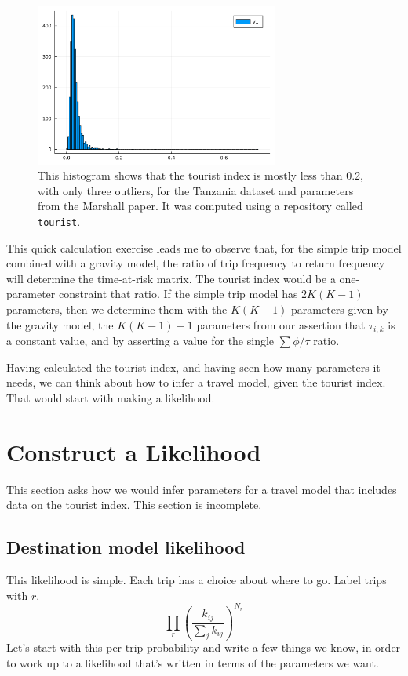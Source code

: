 \documentclass{article}
\begin{document}
\begin{figure}
\centering\includegraphics[width=8cm]{tanzania_tourists.png}
\caption{This histogram shows that the tourist index is mostly less than 0.2, with only three outliers, for the Tanzania dataset and parameters from the Marshall paper. It was computed using a repository called \texttt{tourist}.\label{fig:tantour}}
\end{figure}

This quick calculation exercise leads me to observe that, for the simple trip model combined with a gravity model, the ratio of trip frequency to return frequency will determine the time-at-risk matrix. The tourist index would be a one-parameter constraint that ratio. If the simple trip model has $2K(K-1)$ parameters, then we determine them with the $K(K-1)$ parameters given by the gravity model, the $K(K-1) - 1$ parameters from our assertion that $\tau_{i,k}$ is a constant value, and by asserting a value for the single $\sum\phi/\tau$ ratio.

Having calculated the tourist index, and having seen how many parameters it needs, we can think about how to infer a travel model, given the tourist index. That would start with making a likelihood.


\section{Construct a Likelihood}

This section asks how we would infer parameters for a travel model that includes data on the tourist index. This section is incomplete.

\subsection{Destination model likelihood}

This likelihood is simple. Each trip has a choice about where to go. Label trips with $r$.
\begin{equation}
  \prod_{r} \left(\frac{k_{ij}}{\sum_{j} k_{ij}}\right)^{N_r}\label{eqn:destinationlikelihood}
\end{equation}
Let's start with this per-trip probability and write a few things we know, in order to work up to a likelihood that's written in terms of the parameters we want.
\end{document}
